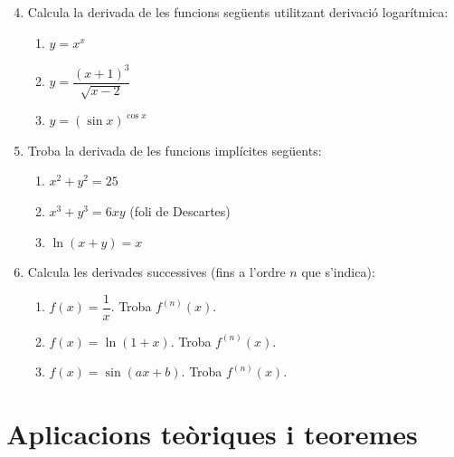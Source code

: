 \documentclass[12pt]{article}
\begin{document}
\begin{enumerate}[label=\arabic*.]
    \setcounter{enumi}{3}
    \item Calcula la derivada de les funcions següents utilitzant derivació logarítmica:
    \begin{enumerate}[label=\alph*)]
        \item $y = x^x$
        \item $y = \dfrac{(x+1)^3}{\sqrt{x-2}}$
        \item $y = (\sin x)^{\cos x}$
    \end{enumerate}

    \item Troba la derivada de les funcions implícites següents:
    \begin{enumerate}[label=\alph*)]
        \item $x^2 + y^2 = 25$
        \item $x^3 + y^3 = 6xy$ \quad (foli de Descartes)
        \item $\ln(x+y) = x$
    \end{enumerate}

    \item Calcula les derivades successives (fins a l'ordre $n$ que s'indica):
    \begin{enumerate}[label=\alph*)]
        \item $f(x)=\dfrac{1}{x}$. Troba $f^{(n)}(x)$.
        \item $f(x)=\ln(1+x)$. Troba $f^{(n)}(x)$.
        \item $f(x)=\sin(ax+b)$. Troba $f^{(n)}(x)$.
    \end{enumerate}
\end{enumerate}

\section*{Aplicacions teòriques i teoremes}
\end{document}
